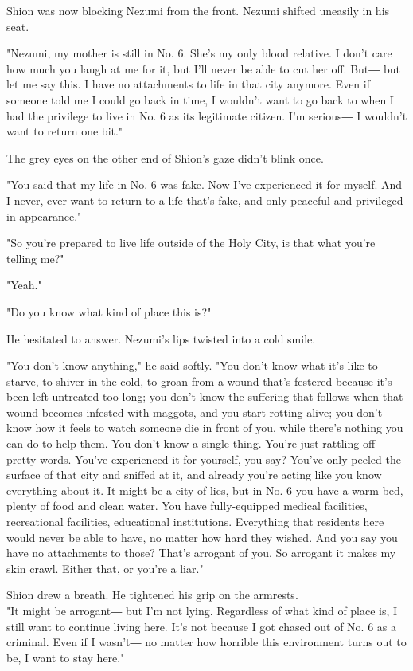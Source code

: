 Shion was now blocking Nezumi from the front. Nezumi shifted uneasily in
his seat.

"Nezumi, my mother is still in No. 6. She's my only blood relative. I
don't care how much you laugh at me for it, but I'll never be able to
cut her off. But― but let me say this. I have no attachments to life in
that city anymore. Even if someone told me I could go back in time, I
wouldn't want to go back to when I had the privilege to live in No. 6 as
its legitimate citizen. I'm serious― I wouldn't want to return one bit."

The grey eyes on the other end of Shion's gaze didn't blink once.

"You said that my life in No. 6 was fake. Now I've experienced it for
myself. And I never, ever want to return to a life that's fake, and only
peaceful and privileged in appearance."

"So you're prepared to live life outside of the Holy City, is that what
you're telling me?"

"Yeah."

"Do you know what kind of place this is?"

He hesitated to answer. Nezumi's lips twisted into a cold smile.

"You don't know anything," he said softly. "You don't know what it's
like to starve, to shiver in the cold, to groan from a wound that's
festered because it's been left untreated too long; you don't know the
suffering that follows when that wound becomes infested with maggots,
and you start rotting alive; you don't know how it feels to watch
someone die in front of you, while there's nothing you can do to help
them. You don't know a single thing. You're just rattling off pretty
words. You've experienced it for yourself, you say? You've only peeled
the surface of that city and sniffed at it, and already you're acting
like you know everything about it. It might be a city of lies, but in
No. 6 you have a warm bed, plenty of food and clean water. You have
fully-equipped medical facilities, recreational facilities, educational
institutions. Everything that residents here would never be able to
have, no matter how hard they wished. And you say you have no
attachments to those? That's arrogant of you. So arrogant it makes my
skin crawl. Either that, or you're a liar."

Shion drew a breath. He tightened his grip on the armrests.\\

"It might be arrogant― but I'm not lying. Regardless of what kind of
place is, I still want to continue living here. It's not because I got
chased out of No. 6 as a criminal. Even if I wasn't― no matter how
horrible this environment turns out to be, I want to stay here."

